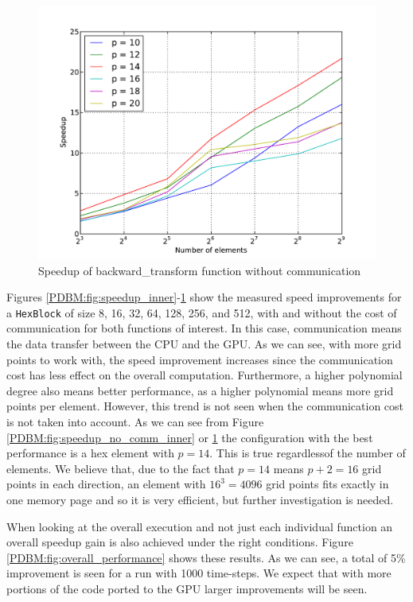 \documentclass{ccr16}
\begin{document}
{        \begin{figure}[h]
            \centering
            \includegraphics[trim = {0in 0.3in 0in 0.3in}, width = 0.5 \textwidth]{./plots/PDBM_speedup_no_comm_backward.pdf}
            \caption{Speedup of \textup{backward\_transform} function without communication}
            \label{PDBM:fig:speedup_no_comm_backward}
        \end{figure}

        Figures \ref{PDBM:fig:speedup_inner}-\ref{PDBM:fig:speedup_no_comm_backward} show the measured speed improvements for a \texttt{HexBlock} of size 8, 16, 32, 64, 128, 256, and 512, with and without the cost of communication for both functions of interest. In this case, communication means the data transfer between the CPU and the GPU. As we can see, with more grid points to work with, the speed improvement increases since the communication cost has less effect on the overall computation. Furthermore, a higher polynomial degree also means better performance, as a higher polynomial means more grid points per element. However, this trend is not seen when the communication cost is not taken into account. As we can see from Figure \ref{PDBM:fig:speedup_no_comm_inner} or \ref{PDBM:fig:speedup_no_comm_backward} the configuration with the best performance is a hex element with $p = 14$. This is true regardlessof the number of elements. We believe that, due to the fact that $p = 14$ means $p + 2 = 16$ grid points in each direction, an element with $16^{3} = 4096$ grid points fits exactly in one memory page and so it is very efficient, but further investigation is needed.

        When looking at the overall execution and not just each individual function an overall speedup gain is also achieved under the right conditions. Figure \ref{PDBM:fig:overall_performance} shows these results. As we can see, a total of 5\% improvement is seen for a run with 1000 time-steps. We expect that with more portions of the code ported to the GPU larger improvements will be seen.

}
\end{document}
